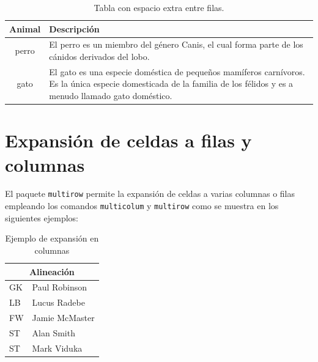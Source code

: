 \documentclass[ 		%
	11pt,				%
	a4paper,			%
	twoside,			%
	openright,			%
	final       		%
]{book}
\begin{document}
\begin{table}[H]
   \centering
   	  \caption{Tabla con espacio extra entre filas.}
   	  \label{tab:espace}      
    \begin{tabular}{cp{9cm}}
      \toprule
      Animal & Descripción \\
      \midrule
      perro  & El perro es un miembro del género Canis, el cual forma parte 
               de los cánidos derivados del lobo. \\
      \addlinespace
      gato   & El gato es una especie doméstica de pequeños mamíferos carnívoros. Es la 
               única especie domesticada de la familia de los félidos y es a menudo llamado 
    		   gato doméstico. \\
      \bottomrule
    \end{tabular}
\end{table}






\section{Expansión de celdas a filas y columnas}
El paquete \texttt{multirow} permite la expansión de celdas a varias columnas o filas empleando los comandos \texttt{multicolum} y \texttt{multirow} como se muestra en los siguientes ejemplos:

\begin{table}[H]%
	\centering
	\caption{Ejemplo de expansión en columnas}
	\label{tab:expcolumnas}
	\begin{tabular}{|l|l|} %
	\hline
	\multicolumn{2}{|c|}{Alineación} \\
	\hline
	GK & Paul Robinson \\
	LB & Lucus Radebe \\
	FW & Jamie McMaster \\
	ST & Alan Smith \\
	ST & Mark Viduka \\
	\hline
	\end{tabular}
\end{table}
\end{document}
